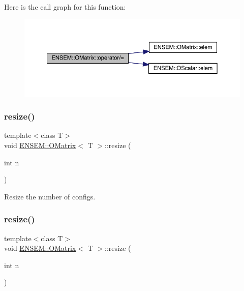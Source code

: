 Here is the call graph for this function\+:
\nopagebreak
\begin{figure}[H]
\begin{center}
\leavevmode
\includegraphics[width=350pt]{dd/d80/classENSEM_1_1OMatrix_a46dc90e0e33442dcdcb9e98f9cf0025e_cgraph}
\end{center}
\end{figure}
\mbox{\label{classENSEM_1_1OMatrix_abb999e63b84b6d958e43443dc04e46be}} 
\subsubsection{\texorpdfstring{resize()}{resize()}\hspace{0.1cm}{\footnotesize\ttfamily [1/2]}}
{\footnotesize\ttfamily template$<$class T$>$ \\
void \mbox{\hyperlink{classENSEM_1_1OMatrix}{E\+N\+S\+E\+M\+::\+O\+Matrix}}$<$ T $>$\+::resize (\begin{DoxyParamCaption}\item[{int}]{n }\end{DoxyParamCaption})\hspace{0.3cm}{\ttfamily [inline]}}



Resize the number of configs. 

\mbox{\label{classENSEM_1_1OMatrix_abb999e63b84b6d958e43443dc04e46be}} 
\subsubsection{\texorpdfstring{resize()}{resize()}\hspace{0.1cm}{\footnotesize\ttfamily [2/2]}}
{\footnotesize\ttfamily template$<$class T$>$ \\
void \mbox{\hyperlink{classENSEM_1_1OMatrix}{E\+N\+S\+E\+M\+::\+O\+Matrix}}$<$ T $>$\+::resize (\begin{DoxyParamCaption}\item[{int}]{n }\end{DoxyParamCaption})\hspace{0.3cm}{\ttfamily [inline]}}



